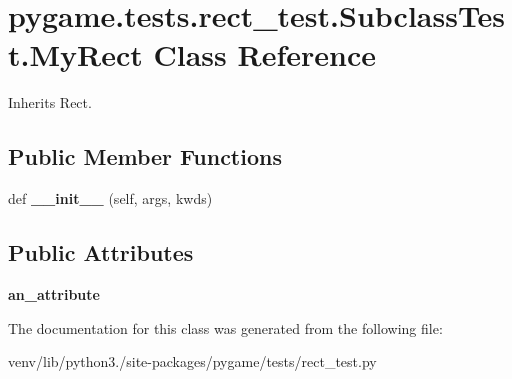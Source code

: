 \hypertarget{classpygame_1_1tests_1_1rect__test_1_1_subclass_test_1_1_my_rect}{}\section{pygame.\+tests.\+rect\+\_\+test.\+Subclass\+Test.\+My\+Rect Class Reference}
\label{classpygame_1_1tests_1_1rect__test_1_1_subclass_test_1_1_my_rect}


Inherits Rect.

\subsection*{Public Member Functions}
\begin{DoxyCompactItemize}
\item 
\mbox{\label{classpygame_1_1tests_1_1rect__test_1_1_subclass_test_1_1_my_rect_ac9ea5f7e36075d2552c7dd99e9f54a6b}} 
def {\bfseries \+\_\+\+\_\+init\+\_\+\+\_\+} (self, args, kwds)
\end{DoxyCompactItemize}
\subsection*{Public Attributes}
\begin{DoxyCompactItemize}
\item 
\mbox{\label{classpygame_1_1tests_1_1rect__test_1_1_subclass_test_1_1_my_rect_aa440b438810e6d07b3317b85792f7580}} 
{\bfseries an\+\_\+attribute}
\end{DoxyCompactItemize}


The documentation for this class was generated from the following file\+:\begin{DoxyCompactItemize}
\item 
venv/lib/python3./site-\/packages/pygame/tests/rect\+\_\+test.\+py\end{DoxyCompactItemize}
